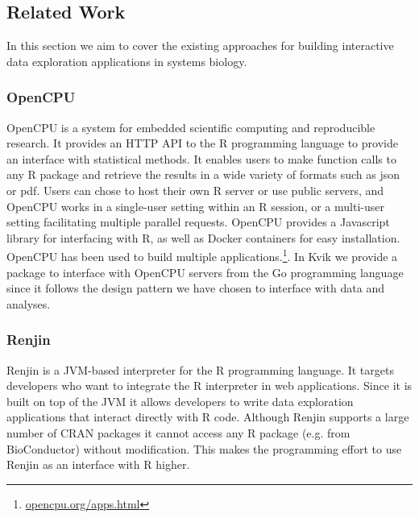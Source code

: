 \subsection*{Related Work} 
In this section we aim to cover the existing approaches for building interactive
data exploration applications in systems biology. 



\subsubsection*{OpenCPU} 
OpenCPU is a system for embedded scientific computing and reproducible
research.\cite{opencpu} It provides an HTTP API to the R programming language to
provide an interface with statistical methods. It enables users to make function
calls to any R package and retrieve the results in a wide variety of formats
such as json or pdf. 
Users can chose to host their own R server or use public servers, and OpenCPU
works in a single-user setting within an R session, or a multi-user setting
facilitating multiple parallel requests. 
OpenCPU provides a Javascript library for interfacing with R, as well as Docker
containers for easy installation. OpenCPU has been used to build multiple
applications.\footnote{\url{opencpu.org/apps.html}}.
In Kvik we provide a package
to interface with OpenCPU servers from the Go programming language since it
follows the design pattern we have chosen to interface with data and analyses. 


\subsubsection*{Renjin} 
Renjin is a JVM-based interpreter for the R programming language.\cite{renjin}
It targets developers who want to integrate the R interpreter in web
applications. Since it is built on top of the JVM it allows developers to write
data exploration applications that interact directly with R code. Although
Renjin supports a large number of CRAN packages it cannot access any R package
(e.g. from BioConductor) without modification. This makes the programming effort
to use Renjin as an interface with R higher. 

